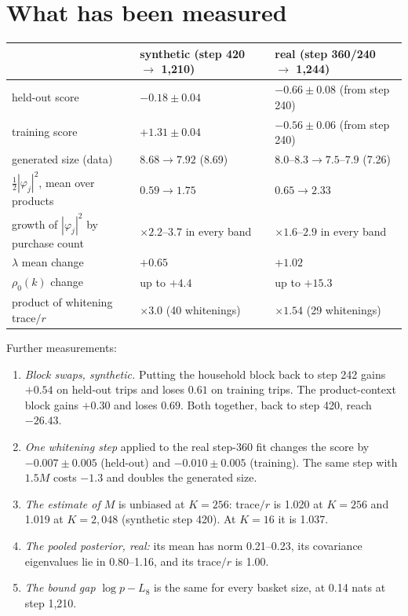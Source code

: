 \documentclass[11pt]{article}
\theoremstyle{remark}\newtheorem{remark}{Remark}
\begin{document}
\section{What has been measured}\label{sec:facts}

\begin{center}\small
\begin{tabular}{lll}
\toprule
& synthetic (step 420 $\to$ 1,210) & real (step 360/240 $\to$ 1,244)\\
\midrule
held-out score & $-0.18\pm0.04$ & $-0.66\pm0.08$ (from step 240)\\
training score & $+1.31\pm0.04$ & $-0.56\pm0.06$ (from step 240)\\
generated size (data) & $8.68\to7.92$ (8.69) & $8.0$--$8.3\to7.5$--$7.9$ (7.26)\\
$\tfrac12|\varphi_j|^2$, mean over products & $0.59\to1.75$ & $0.65\to2.33$\\
growth of $|\varphi_j|^2$ by purchase count & $\times2.2$--$3.7$ in every band & $\times1.6$--$2.9$ in every band\\
$\lambda$ mean change & $+0.65$ & $+1.02$\\
$\rho_0(k)$ change & up to $+4.4$ & up to $+15.3$\\
product of whitening trace$/r$ & $\times3.0$ (40 whitenings) & $\times1.54$ (29 whitenings)\\
\bottomrule
\end{tabular}
\end{center}

Further measurements:
\begin{enumerate}
\item \emph{Block swaps, synthetic.} Putting the household block back to step 242 gains
  $+0.54$ on held-out trips and loses $0.61$ on training trips. The product-context block gains
  $+0.30$ and loses $0.69$. Both together, back to step 420, reach $-26.43$.
\item \emph{One whitening step} applied to the real step-360 fit changes the score by $-0.007\pm0.005$
  (held-out) and $-0.010\pm0.005$ (training). The same step with $1.5M$ costs $-1.3$ and doubles
  the generated size.
\item \emph{The estimate of $M$} is unbiased at $K=256$: trace$/r$ is 1.020 at $K=256$ and 1.019 at
  $K=2{,}048$ (synthetic step 420). At $K=16$ it is 1.037.
\item \emph{The pooled posterior, real:} its mean has norm 0.21--0.23, its covariance eigenvalues
  lie in 0.80--1.16, and its trace$/r$ is 1.00.
\item \emph{The bound gap} $\log p-L_8$ is the same for every basket size, at 0.14 nats at step 1,210.
\end{enumerate}
\end{document}
